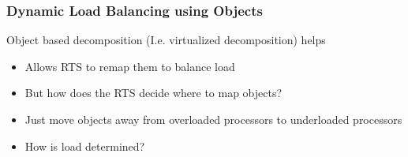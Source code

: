 
\begin{frame}[fragile]
\frametitle{Dynamic Load Balancing using Objects}

Object based decomposition (I.e. virtualized decomposition) helps
\begin{itemize}
 \item Allows RTS to remap them to balance load
 \item But how does the RTS decide where to map objects?
 \item Just move objects away from overloaded processors to underloaded processors
 \item How is load determined?
\end{itemize}
\end{frame}

